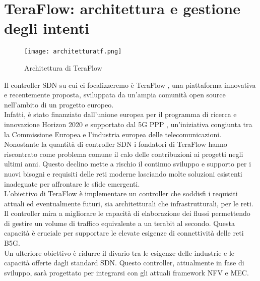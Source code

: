 \chapter{TeraFlow: architettura e gestione degli intenti}
\label{cap:teraflow}
\begin{figure}[h]
    \centering
   \texttt{[image: architetturatf.png]}
    \caption{Architettura di TeraFlow \cite{archtfs}}
    \label{fig:tfs}
\end{figure}
Il controller SDN su cui ci focalizzeremo è TeraFlow \cite{TeraFlow}, una piattaforma innovativa e recentemente proposta, sviluppata da un'ampia comunità open source nell'ambito di un progetto europeo. 
\\Infatti, è stato finanziato dall'unione europea per il programma di ricerca e innovazione Horizon 2020 \cite{Horizon} e supportato dal 5G PPP \cite{5GPPP}, un'iniziativa congiunta tra la Commissione Europea e l'industria europea delle telecomunicazioni.
Nonostante la quantità di controller SDN i fondatori di TeraFlow hanno riscontrato come problema comune il calo delle contribuzioni ai progetti negli ultimi anni. 
Questo declino mette a rischio il continuo sviluppo e supporto per i nuovi bisogni e requisiti delle reti moderne lasciando molte soluzioni esistenti inadeguate per affrontare le sfide emergenti.
\\L'obiettivo di TeraFlow è implementare un controller che soddisfi i requisiti attuali ed eventualmente futuri, sia architetturali che infrastrutturali, per le reti.
Il controller mira a migliorare le capacità di elaborazione dei flussi permettendo di gestire un volume di traffico equivalente a un terabit al secondo. 
Questa capacità è cruciale per supportare le elevate esigenze di connettività delle reti B5G.
\\Un ulteriore obiettivo è ridurre il divario tra le esigenze delle industrie e le capacità offerte dagli standard SDN.
Questo controller, attualmente in fase di sviluppo, sarà progettato per integrarsi con gli attuali framework NFV e MEC.
